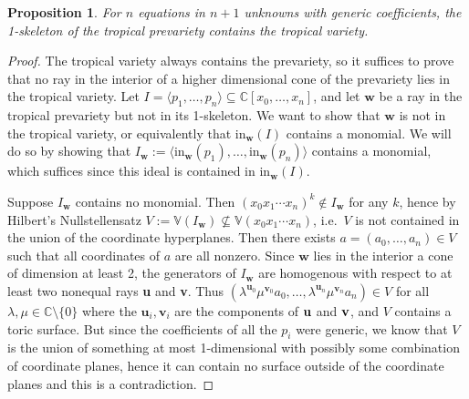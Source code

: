 \documentclass[12pt]{amsart}
\newtheorem{proposition}[theorem]{Proposition}
\begin{document}
\begin{proposition}
For $n$ equations in $n+1$ unknowns with generic coefficients, the 1-skeleton of the tropical prevariety contains the tropical variety.
\end{proposition}

\begin{proof}
The tropical variety always contains the prevariety, so it suffices to prove that no ray in the interior of a higher dimensional cone of the prevariety lies in the tropical variety. Let $I=\langle p_1,\ldots,p_n\rangle \subseteq \mathbb{C}[x_0,\ldots,x_n]$, and let $\mathbf{w}$ be a ray in the tropical prevariety but not in its 1-skeleton. We want to show that $\mathbf{w}$ is not in the tropical variety, or equivalently that $\text{in}_\mathbf{w}(I)$ contains a monomial. We will do so by showing that $I_\mathbf{w}:=\langle \text{in}_\mathbf{w}(p_1),\ldots,\text{in}_\mathbf{w}(p_n)\rangle$ contains a monomial, which suffices since this ideal is contained in $\text{in}_\mathbf{w}(I)$.

Suppose $I_\mathbf{w}$ contains no monomial. Then $(x_0x_1\cdots x_n)^k\notin I_\mathbf{w}$ for any $k$, hence by Hilbert's Nullstellensatz $V:=\mathbb{V}(I_\mathbf{w})\nsubseteq \mathbb{V}(x_0x_1\cdots x_n)$, i.e.\ $V$ is not contained in the union of the coordinate hyperplanes. Then there exists $a=(a_0,\ldots,a_n)\in V$ such that all coordinates of $a$ are all nonzero. Since $\mathbf{w}$ lies in the interior a cone of dimension at least 2, the generators of $I_\mathbf{w}$ are homogenous with respect to at least two nonequal rays {\bf u} and {\bf v}. Thus $(\lambda^{\mathbf{u}_0}\mu^{\mathbf{v}_0} a_0,\ldots,\lambda^{\mathbf{u}_n}\mu^{\mathbf{v}_n} a_n)\in V$ for all $\lambda,\mu\in\mathbb{C}\setminus\{0\}$ where the $\mathbf{u}_i,\mathbf{v}_i$ are the components of $\bf u$ and $\bf v$, and $V$ contains a toric surface. But since the coefficients of all the $p_i$ were generic, we know that $V$ is the union of something at most 1-dimensional with possibly some combination of coordinate planes, hence it can contain no surface outside of the coordinate planes and this is a contradiction.
\end{proof}



\end{document}
